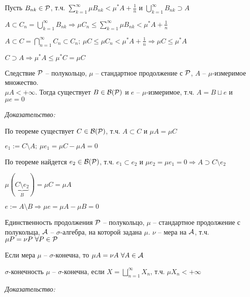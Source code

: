 \documentclass[12pt]{article}
\begin{document}
Пусть $B_{nk} \in \P$, т.ч. $\sum\limits_{k = 1}^\infty \mu B_{nk} < \mu^* A + \frac{1}{n}$ и $\bigcup\limits_{k = 1}^\infty B_{nk} \supset A$

$A \subset C_n = \bigcup\limits_{k = 1}^\infty B_{nk} \Rightarrow \mu C_n \leq \sum\limits_{k = 1}^\infty \mu B_{nk} < \mu^* A + \frac{1}{n}$

$A \subset C = \bigcap\limits_{n = 1}^\infty C_n \subset C_n;\ \mu C \leq \mu C_n < \mu^* A + \frac{1}{n} \Rightarrow \mu C \leq \mu^* A$

$C \supset A \Rightarrow \mu^* A \leq \mu^* C = \mu C$

\begin{theo}{Следствие}
    $\P$ -- полукольцо, $\mu$ -- стандартное продолжение с $\P$, $A$ -- $\mu$-измеримое множество. \\ $\mu A < + \infty$. Тогда существует $B \in \B(\P)$ и $e$ -- $\mu$-измеримое, т.ч. $A = B \sqcup e$ и $\mu e = 0$
\end{theo}

\textit{Доказательство:}

По теореме существует $C \in \B(\P)$, т.ч. $A \subset C$ и $\mu A = \mu C$

$e_1 := C \setminus A;\ \mu e_1 = \mu C - \mu A = 0$

По теореме найдется $e_2 \in \B(\P)$, т.ч. $e_1 \subset e_2$ и $\mu e_2 = \mu e_1 = 0 \Rightarrow A \supset C \setminus e_2$

$\mu(\underbrace{C \setminus e_2}_{B}) = \mu C = \mu A$

$e := A \setminus B \Rightarrow \mu e = \mu A - \mu B = 0$

\begin{theo}{Единственность продолжения}
    $\P$ -- полукольцо, $\mu$ -- стандартное продолжение с полукольца, $\A$ -- $\sigma$-алгебра, на которой задана $\mu$. $\nu$ -- мера на $\A$, т.ч. $\mu P = \nu P\ \forall P \in \P$

    Если мера $\mu$ -- $\sigma$-конечна, то $\mu A = \nu A\ \forall A \in \A$

    \begin{Reminder}{$\sigma$-конечность}
        $\mu$ -- $\sigma$-конечна, если $X = \bigsqcup\limits_{n = 1}^\infty X_n$, т.ч. $\mu X_n < + \infty$
    \end{Reminder}
\end{theo}

\textit{Доказательство:}
\end{document}
